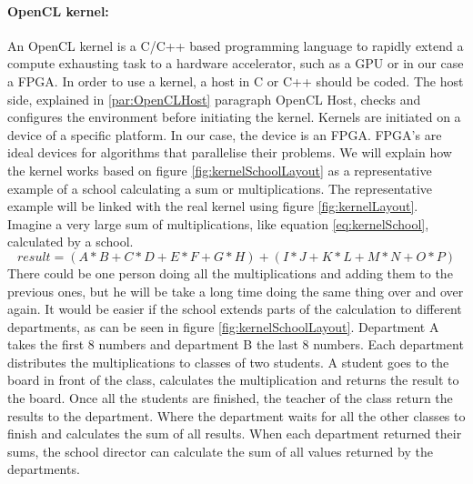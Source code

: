 \documentclass[12pt,a4paper,english,twoside,openright]{tutthesis}
\begin{document}
				\paragraph{OpenCL kernel:}\label{par:OpenCLKernel}
An OpenCL kernel is a C/C++ based programming language to rapidly extend a compute exhausting task to a hardware accelerator, such as a GPU or in our case a FPGA. In order to use a kernel, a host in C or C++ should be coded. The host side, explained in \ref{par:OpenCLHost} paragraph OpenCL Host, checks and configures the environment before initiating the kernel. Kernels are initiated on a device of a specific platform. In our case, the device is an FPGA. FPGA's are ideal devices for algorithms that parallelise their problems. We will explain how the kernel works based on figure \ref{fig:kernelSchoolLayout} as a representative example of a school calculating a sum or multiplications. The representative example will be linked with the real kernel using figure \ref{fig:kernelLayout}. Imagine a very large sum of multiplications, like equation \ref{eq:kernelSchool}, calculated by a school.
\begin{equation} \label{eq:kernelSchool}
   result=(A*B+C*D+E*F+G*H)+(I*J+K*L+M*N+O*P)
\end{equation}
There could be one person doing all the multiplications and adding them to the previous ones, but he will be take a long time doing the same thing over and over again. It would be easier if the school extends parts of the calculation to different departments, as can be seen in figure \ref{fig:kernelSchoolLayout}. Department A takes the first 8 numbers and department B the last 8 numbers. Each department distributes the multiplications to classes of two students. A student goes to the board in front of the class, calculates the multiplication and returns the result to the board. Once all the students are finished, the teacher of the class return the results to the department. Where the department waits for all the other classes to finish and calculates the sum of all results. When each department returned their sums, the school director can calculate the sum of all values returned by the departments.
\end{document}
